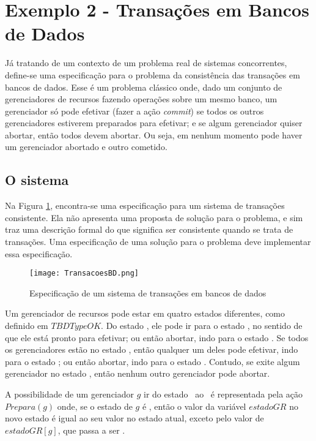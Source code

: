 \section{Exemplo 2 - Transações em Bancos de Dados}
\label{exemplo2}

Já tratando de um contexto de um problema real de sistemas concorrentes, define-se uma especificação para o problema da consistência das transações em bancos de dados. Esse é um problema clássico onde, dado um conjunto de gerenciadores de recursos fazendo operações sobre um mesmo banco, um gerenciador só pode efetivar (fazer a ação \textit{commit}) se todos os outros gerenciadores estiverem preparados para efetivar; e se algum gerenciador quiser abortar, então todos devem abortar. Ou seja, em nenhum momento pode haver um gerenciador abortado e outro cometido.

\subsection{O sistema}

Na Figura \ref{fig:ex2tla}, encontra-se uma especificação para um sistema de transações consistente. Ela não apresenta uma proposta de solução para o problema, e sim traz uma descrição formal do que significa ser consistente quando se trata de transações. Uma especificação de uma solução para o problema deve implementar essa especificação.

\begin{figure}[h]
  \centering
  \texttt{[image: TransacoesBD.png]}
  \caption{Especificação de um sistema de transações em bancos de dados}
\label{fig:ex2tla}
\end{figure}

Um gerenciador de recursos pode estar em quatro estados diferentes, como definido em $TBDTypeOK$. Do estado \trabalhando, ele pode ir para o estado \preparado, no sentido de que ele está pronto para efetivar; ou então abortar, indo para o estado \abortado. Se todos os gerenciadores estão no estado \preparado, então qualquer um deles pode efetivar, indo para o estado \cometido; ou então abortar, indo para o estado \abortado. Contudo, se exite algum gerenciador no estado \cometido, então nenhum outro gerenciador pode abortar.

A possibilidade de um gerenciador $g$ ir do estado \trabalhando\ ao \preparado\ é representada pela ação $Prepara(g)$ onde, se o estado de $g$ é \trabalhando, então o valor da variável $estadoGR$ no novo estado é igual ao seu valor no estado atual, exceto pelo valor de $estadoGR[g]$, que passa a ser \preparado.

